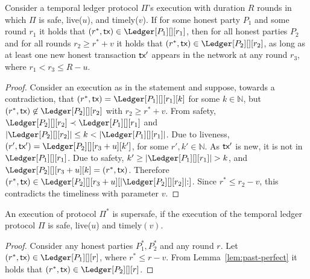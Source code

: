\begin{lemma}\label{lem:past-perfect}
  Consider a temporal ledger protocol $\Pi$'s
  execution with duration $R$ rounds in which $\Pi$ is
  safe, live($u$), and timely($v$).
  If for some honest party $P_1$ and some round $r_1$ it holds that
  $(r^*, \tx) \in \Ledger[P_1][][r_1]$, then
  for all honest parties $P_2$ and for all rounds $r_2 \geq r^* + v$
  it holds that $(r^*, \tx) \in \Ledger[P_2][][r_2]$,
  as long as at least one new honest transaction $\textsf{tx}'$ appears in the
  network at any round $r_3$, where $r_1 < r_3 \leq R - u$.
\end{lemma}
\begin{proof}
  Consider an execution as in the statement and suppose, towards a contradiction,
  that $(r^*, \tx) = \Ledger[P_1][][r_1][k]$ for some $k \in \mathbb{N}$,
  but $(r^*, \tx) \not\in \Ledger[P_2][][r_2]$
  with $r_2 \geq r^* + v$.
  From safety,
  $\Ledger[P_2][][r_2] \prec \Ledger[P_1][][r_1]$ and
  $|\Ledger[P_2][][r_2]| \leq k < |\Ledger[P_1][][r_1]|$.
  Due to liveness, $(r', \tx') = \Ledger[P_2][][r_3 + u][k']$,
  for some $r', k' \in \mathbb{N}$.
  As $\textsf{tx}'$ is new, it is not in $\Ledger[P_1][][r_1]$.
  Due to safety, $k' \geq |\Ledger[P_1][][r_1]| > k$, and
  $\Ledger[P_2][][r_3 + u][k] = (r^*, \tx)$.
  Therefore
  $(r^*, \tx) \in \Ledger[P_2][][r_3 + u][|\Ledger[P_2][][r_2]|{:}]$.
  Since $r^* \leq r_2 - v$, this contradicts the timeliness with parameter $v$.\Qed
\end{proof}

\begin{conjecture}
  An execution of protocol $\Pi^*$ is supersafe, if the execution of the
  temporal ledger protocol $\Pi$ is safe, live($u$) and timely$(v)$.
\end{conjecture}
\begin{proof}
  Consider any honest parties $P_1^*,P_2^*$ and any round $r$.
  Let $(r^*, \tx) \in \Ledger[P_1][][r]$, where $r^* \leq r - v$.
  From Lemma~\ref{lem:past-perfect} it holds that
  $(r^*, \tx) \in \Ledger[P_2][][r]$.

\end{proof}

